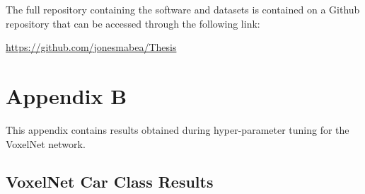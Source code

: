 The full repository containing the software and datasets is contained on a Github repository that can be accessed through the following link: 

\url {https://github.com/jonesmabea/Thesis}


\chapter{Appendix B}
\label{chap:res}
This appendix contains results obtained during hyper-parameter tuning for the VoxelNet network.
\section{VoxelNet Car Class Results}

\begin{table}[H]
	\centering
	\caption{Batch Size-2, Alpha-1, Beta-10, Learning Rate-0.0010, Epochs-160}
	\label{}
\end{table}


\begin{table}[H]
	\centering
	\caption{Batch Size-2, Alpha-1.5, Beta-1, Learning Rate-0.001, SGD(Stochastic Gradient Descent), Epochs-160}
	\label{}
\end{table}


\begin{table}[H]
	\centering
	\caption{Batch Size-2, Alpha-1.5, Beta-1, Learning Rate-0.001, Epochs-160}
	\label{}
\end{table}


